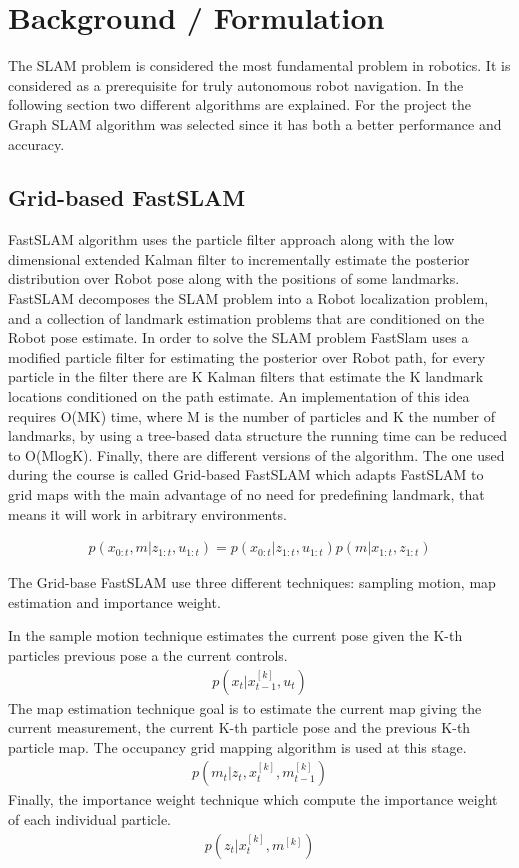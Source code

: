 \documentclass[10pt,journal,compsoc]{IEEEtran}
\begin{document}
\section{Background / Formulation}
The SLAM problem is considered the most fundamental problem in robotics. It is considered as a prerequisite for truly autonomous robot navigation. In the following section two different algorithms are explained. For the project the Graph SLAM algorithm was selected since it has both a better performance and accuracy.
\subsection{Grid-based FastSLAM}
FastSLAM algorithm uses the particle filter approach along with the low dimensional extended Kalman filter to incrementally estimate the posterior distribution over Robot pose along with the positions of some landmarks. FastSLAM decomposes the SLAM problem into a Robot localization problem, and a collection of landmark estimation problems that are conditioned on the Robot pose estimate. In order to solve the SLAM problem FastSlam uses a modified particle filter for estimating the posterior over Robot path, for every particle in the filter there are K Kalman filters that estimate the K landmark locations conditioned on the path estimate. An implementation of this idea requires {O(MK)} time, where M is the number of particles and K the number of landmarks, by using a tree-based data structure the running time can be reduced to {O(MlogK)}. Finally, there are different versions of the algorithm. The one used during the course is called Grid-based FastSLAM which adapts FastSLAM to grid maps with the main advantage of no need for predefining landmark, that means it will work in arbitrary environments.

\begin{align}
p(x_{0:t},m|z_{1:t},u_{1:t})=p(x_{0:t}|z_{1:t},u_{1:t})p(m|x_{1:t},z_{1:t})
\end{align}

The Grid-base FastSLAM use three different techniques: sampling motion, map estimation and importance weight.

In the sample motion technique estimates the current pose given the K-th particles previous pose a the current controls.
\begin{align}
p(x_{t}|x_{t-1}^{[k]},u_{t})
\end{align}
The map estimation technique goal is to estimate the current map giving the current measurement, the current K-th particle pose and the previous K-th particle map. The occupancy grid mapping algorithm is used at this stage.
\begin{align}
p(m_{t}|z_{t},x_{t}^{[k]},m_{t-1}^{[k]})
\end{align}
Finally, the importance weight technique which compute the importance weight of each individual particle.
\begin{align}
p(z_{t}|x_{t}^{[k]},m^{[k]})
\end{align}
\end{document}
